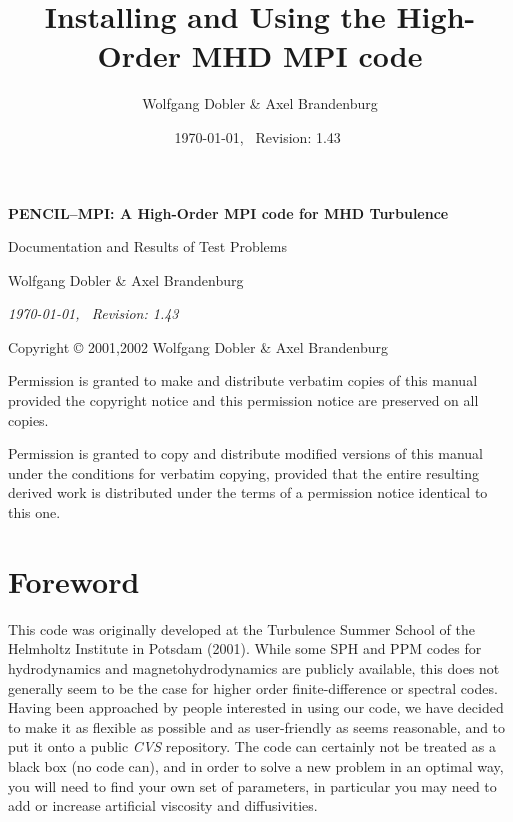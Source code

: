 \documentclass[12pt,twoside,notitlepage,a4paper]{article}
\title{{\sffamily\bfseries Installing and Using the High-Order MHD MPI code}}
\author{Wolfgang Dobler \& Axel Brandenburg}
\date{\today,~ $ $Revision: 1.43 $ $}
\newcommand{\name}[1]{\textsl{#1}\index{#1}\/}
\begin{document}
\pagestyle{empty}


\begin{titlepage}
  \begin{center}

  \large

  \vspace*{3cm}

  {\Large\sffamily\bfseries PENCIL--MPI: A High-Order MPI code for MHD Turbulence}

  \vspace{0.5cm}

  {\sffamily Documentation and Results of Test Problems}

  \vspace{1.5cm}

  {Wolfgang Dobler \& Axel Brandenburg}


  \vspace{2cm}

  \emph{\today,~ $ $Revision: 1.43 $ $}


\end{center}

\end{titlepage}


\newpage
\mbox{}
\vfill

Copyright \copyright{} 2001,2002 Wolfgang Dobler \& Axel Brandenburg
\bigskip

Permission is granted to make and distribute verbatim copies of
this manual provided the copyright notice and this permission notice
are preserved on all copies.

Permission is granted to copy and distribute modified versions
of this manual under the conditions for verbatim copying,
provided that the entire resulting derived work is distributed under the
terms of a permission notice identical to this one.


\clearpage
\pagestyle{plain}

\section*{Foreword}

This code was originally developed at the Turbulence Summer School of the
Helmholtz Institute in Potsdam (2001).
While some SPH and PPM codes for hydrodynamics and magnetohydrodynamics
are publicly available, this does not generally seem to be
the case for higher order finite-difference or spectral codes.
Having been approached by people interested in using our code, we have
decided to make it as flexible as possible and as user-friendly as seems
reasonable, and to put it onto a public \name{CVS} repository.
The code can certainly not be treated as a black box (no code can), and in
order to solve a new problem in an optimal way, you will need to find your
own set of parameters, in particular you may need to add or increase
artificial viscosity and diffusivities.
\end{document}
